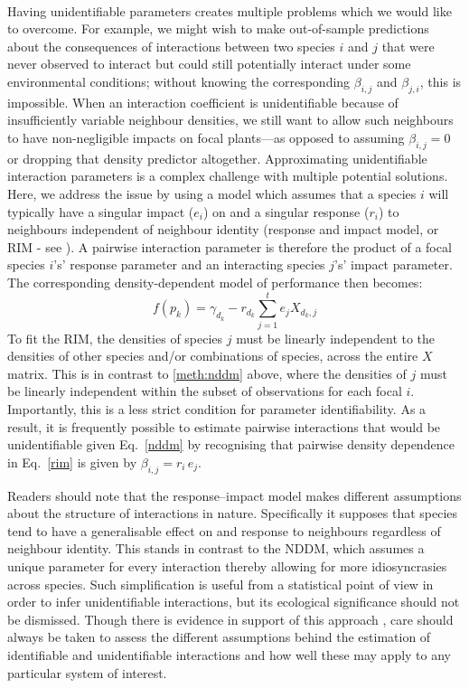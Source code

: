\documentclass[a4,12pt]{article}
\begin{document}
\begin{refsection}
    \paragraph{}
    Having unidentifiable parameters creates multiple problems which we would like to overcome. For example, we might wish to make out-of-sample predictions about the consequences of interactions between two species $i$ and $j$ that were never observed to interact but could still potentially interact under some environmental conditions; without knowing the corresponding $\beta_{i,j}$ and $\beta_{j,i}$, this is impossible. When an interaction coefficient is unidentifiable because of insufficiently variable neighbour densities, we still want to allow such neighbours to have non-negligible impacts on focal plants---as opposed to assuming $\beta_{i,j} = 0$ or dropping that density predictor altogether.
    Approximating unidentifiable interaction parameters is a complex challenge with multiple potential solutions. Here, we address the issue by using a model which assumes that a species $i$ will typically have a singular impact ($e_i$) on and a singular response ($r_i$) to neighbours independent of neighbour identity (response and impact model, or RIM - see \cite{Godoy2014b}). A pairwise interaction parameter is therefore the product of a focal species $i$'s' response parameter and an interacting species $j$'s' impact parameter. The corresponding density-dependent model of performance then becomes:
        \begin{equation}
        f(p_{k}) = \gamma_{d_k} - r_{d_k} \sum_{j=1}^{t} e_{j} X_{d_k, j}
        \label{rim}
        \end{equation}
    To fit the RIM, the densities of species $j$ must be linearly independent to the densities of other species and/or combinations of species, across the entire $X$ matrix. This is in contrast to \ref{meth:nddm} above, where the densities of $j$ must be linearly independent within the subset of observations for each focal $i$. Importantly, this is a less strict condition for parameter identifiability. As a result, it is frequently possible to estimate pairwise interactions that would be unidentifiable given Eq.~\ref{nddm} by recognising that pairwise density dependence in Eq.~\ref{rim} is given by $\beta_{i, j} = r_{i} \, e_{j}$.

    Readers should note that the response--impact model makes different assumptions about the structure of interactions in nature. Specifically it supposes that species tend to have a generalisable effect on and response to neighbours regardless of neighbour identity. This stands in contrast to the NDDM, which assumes a unique parameter for every interaction thereby allowing for more idiosyncrasies across species. Such simplification is useful from a statistical point of view in order to infer unidentifiable interactions, but its ecological significance should not be dismissed. Though there is evidence in support of this approach \parencite{Stouffer2022, Skwara2022}, care should always be taken to assess the different assumptions behind the estimation of identifiable and unidentifiable interactions and how well these may apply to any particular system of interest.


\end{refsection}
\end{document}

